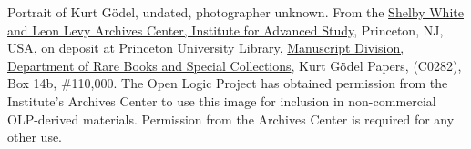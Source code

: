 Portrait of Kurt G\"odel, undated, photographer unknown. From
the \href{https://library.ias.edu/archives}{Shelby White and Leon Levy
Archives Center, Institute for Advanced Study}, Princeton, NJ, USA, on
deposit at Princeton University
Library, \href{http://rbsc.princeton.edu/divisions/manuscripts-division}{Manuscript
Division, Department of Rare Books and Special Collections}, Kurt
G\"odel Papers, (C0282), Box 14b, \#110,000.  The Open Logic Project
has obtained permission from the Institute's Archives Center to use
this image for inclusion in non-commercial OLP-derived materials.
Permission from the Archives Center is required for any other use.
